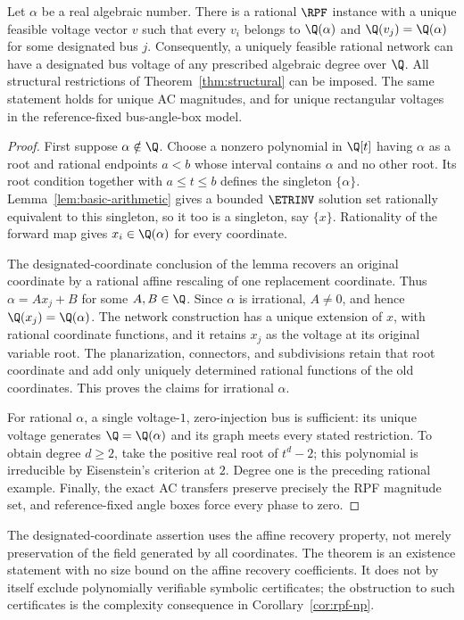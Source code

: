 \begin{theorem}
\label{thm:algebraic-degree}
Let $\alpha$ be a real algebraic number. There is a rational $\RPF$
instance with a unique feasible voltage vector $v$ such that every $v_i$
belongs to $\Q(\alpha)$ and $\Q(v_j)=\Q(\alpha)$ for some designated bus
$j$. Consequently, a uniquely feasible rational network can have a designated
bus voltage of any prescribed algebraic degree over $\Q$.
All structural restrictions of Theorem~\ref{thm:structural} can be imposed.
The same statement holds for unique AC magnitudes, and for unique rectangular
voltages in the reference-fixed bus-angle-box model.
\end{theorem}
\begin{proof}
First suppose $\alpha\notin\Q$. Choose a nonzero polynomial in $\Q[t]$
having $\alpha$ as a root and rational endpoints $a<b$ whose interval
contains $\alpha$ and no other root. Its root condition together with
$a\le t\le b$ defines the singleton $\{\alpha\}$.
Lemma~\ref{lem:basic-arithmetic} gives a bounded $\ETRINV$
solution set rationally equivalent to this singleton, so it too is a
singleton, say $\{x\}$. Rationality of the forward map gives
$x_i\in\Q(\alpha)$ for every coordinate.

The designated-coordinate conclusion of the lemma recovers an original
coordinate by a rational affine rescaling of one replacement coordinate. Thus
$\alpha=A x_j+B$ for some $A,B\in\Q$. Since $\alpha$ is irrational,
$A\ne0$, and hence $\Q(x_j)=\Q(\alpha)$.
The network construction has a unique extension of $x$, with rational
coordinate functions, and it retains $x_j$ as the voltage at its original
variable root. The planarization, connectors, and subdivisions retain that
root coordinate and add only uniquely determined rational functions of the
old coordinates. This proves the claims for irrational $\alpha$.

For rational $\alpha$, a single voltage-$1$, zero-injection bus is sufficient:
its unique voltage generates $\Q=\Q(\alpha)$ and its graph meets every
stated restriction. To obtain degree $d\ge2$, take the positive real root
of $t^d-2$; this polynomial is irreducible by Eisenstein's criterion at $2$.
Degree one is the preceding rational example. Finally, the exact AC transfers
preserve precisely the RPF magnitude set, and reference-fixed angle boxes
force every phase to zero.
\end{proof}

The designated-coordinate assertion uses the affine recovery property,
not merely preservation of the field generated by all coordinates. The
theorem is an existence statement with no size bound on the affine recovery
coefficients. It does not by itself exclude polynomially verifiable
symbolic certificates; the obstruction to such certificates is the
complexity consequence in Corollary~\ref{cor:rpf-np}.
